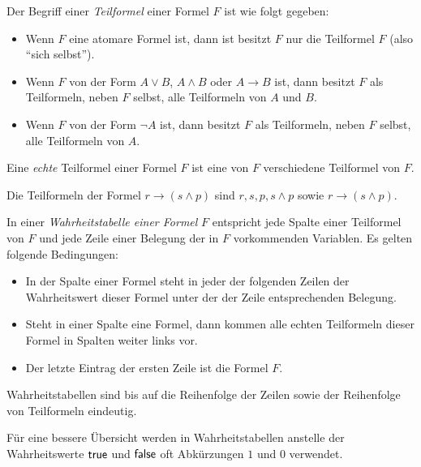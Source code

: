 \begin{df}
    Der Begriff einer \textit{Teilformel} einer Formel $F$ ist wie folgt gegeben:
    \begin{itemize}
        \item Wenn $F$ eine atomare Formel ist, dann ist besitzt $F$ nur die Teilformel $F$ (also ``sich selbst'').
        \item Wenn $F$ von der Form $A\lor B$, $A\land B$ oder $A\to B$ ist, dann besitzt $F$ als Teilformeln, neben $F$ selbst, alle Teilformeln von $A$ und $B$.
        \item Wenn $F$ von der Form $\neg A$ ist, dann besitzt $F$ als Teilformeln, neben $F$ selbst, alle Teilformeln von $A$.
    \end{itemize}
    Eine \textit{echte} Teilformel einer Formel $F$ ist eine von $F$ verschiedene Teilformel von $F$.
\end{df}
\begin{bsp}
    Die Teilformeln der Formel $r\to (s\land p)$ sind $r,s,p,s\land p$ sowie $r\to (s\land p)$.
\end{bsp}
\begin{df}
    In einer \textit{Wahrheitstabelle einer Formel} $F$ entspricht jede Spalte einer Teilformel von $F$ und jede Zeile einer Belegung der in $F$ vorkommenden Variablen. Es gelten folgende Bedingungen:
    \begin{itemize}
        \item In der Spalte einer Formel steht in jeder der folgenden Zeilen der Wahrheitswert dieser Formel unter der der Zeile entsprechenden Belegung.
        \item Steht in einer Spalte eine Formel, dann kommen alle echten Teilformeln dieser Formel in Spalten weiter links vor.
        \item Der letzte Eintrag der ersten Zeile ist die Formel $F$.
    \end{itemize}
\end{df}

\begin{rk}
    Wahrheitstabellen sind bis auf die Reihenfolge der Zeilen sowie der Reihenfolge von Teilformeln eindeutig.
\end{rk}

\begin{rk}
    Für eine bessere Übersicht werden in Wahrheitstabellen anstelle der Wahrheitswerte $\mathsf{true}$ und $\mathsf{false}$ oft Abkürzungen $1$ und $0$ verwendet.
\end{rk}

